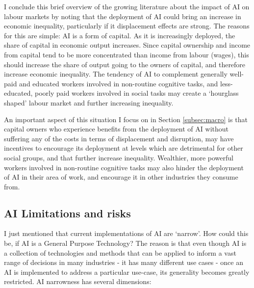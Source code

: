 \documentclass[11pt]{article}
\begin{document}
I conclude this brief overview of the growing literature about the impact of AI on labour markets by noting that the deployment of AI could bring an increase in economic inequality, particularly if it displacement effects are strong. The reasons for this are simple: AI is a form of capital. As it is increasingly deployed, the share of capital in economic output increases. Since capital ownership and income from capital tend to be more concentrated than income from labour (wages), this should increase the share of output going to the owners of capital, and therefore increase economic inequality. The tendency of AI to complement generally well-paid and educated workers involved in non-routine cognitive tasks, and less-educated, poorly paid workers involved in social tasks may create a `hourglass shaped' labour market and further increasing inequality.

An important aspect of this situation I focus on in Section \ref{subsec:macro} is that capital owners who experience benefits from the deployment of AI without suffering any of the costs in terms of displacement and disruption, may have incentives to encourage its deployment at levels which are detrimental for other social groups, and that further increase inequality. Wealthier, more powerful workers involved in non-routine cognitive tasks may also hinder the deployment of AI in their area of work, and encourage it in other industries they consume from. 

\subsection{AI Limitations and risks}
\label{subsec:limits}
I just mentioned that current implementations of AI are  `narrow'. How could this be, if AI is a General Purpose Technology? The reason is that even though AI is a collection of technologies and methods that can be applied to inform a vast range of decisions in many industries - it has many different use cases - once an AI is implemented to address a particular use-case, its generality becomes greatly restricted. AI narrowness has several dimensions:
\end{document}
